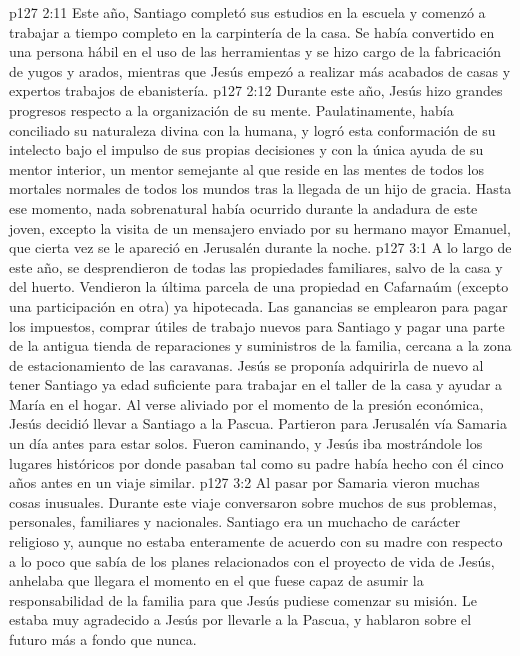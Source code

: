 \vs p127 2:11 \pc Este año, Santiago completó sus estudios en la escuela y comenzó a trabajar a tiempo completo en la carpintería de la casa. Se había convertido en una persona hábil en el uso de las herramientas y se hizo cargo de la fabricación de yugos y arados, mientras que Jesús empezó a realizar más acabados de casas y expertos trabajos de ebanistería.
\vs p127 2:12 \pc Durante este año, Jesús hizo grandes progresos respecto a la organización de su mente. Paulatinamente, había conciliado su naturaleza divina con la humana, y logró esta conformación de su intelecto bajo el impulso de sus propias decisiones y con la única ayuda de su mentor interior, un mentor semejante al que reside en las mentes de todos los mortales normales de todos los mundos tras la llegada de un hijo de gracia. Hasta ese momento, nada sobrenatural había ocurrido durante la andadura de este joven, excepto la visita de un mensajero enviado por su hermano mayor Emanuel, que cierta vez se le apareció en Jerusalén durante la noche.
\vs p127 3:1 A lo largo de este año, se desprendieron de todas las propiedades familiares, salvo de la casa y del huerto. Vendieron la última parcela de una propiedad en Cafarnaúm (excepto una participación en otra) ya hipotecada. Las ganancias se emplearon para pagar los impuestos, comprar útiles de trabajo nuevos para Santiago y pagar una parte de la antigua tienda de reparaciones y suministros de la familia, cercana a la zona de estacionamiento de las caravanas. Jesús se proponía adquirirla de nuevo al tener Santiago ya edad suficiente para trabajar en el taller de la casa y ayudar a María en el hogar. Al verse aliviado por el momento de la presión económica, Jesús decidió llevar a Santiago a la Pascua. Partieron para Jerusalén vía Samaria un día antes para estar solos. Fueron caminando, y Jesús iba mostrándole los lugares históricos por donde pasaban tal como su padre había hecho con él cinco años antes en un viaje similar.
\vs p127 3:2 Al pasar por Samaria vieron muchas cosas inusuales. Durante este viaje conversaron sobre muchos de sus problemas, personales, familiares y nacionales. Santiago era un muchacho de carácter religioso y, aunque no estaba enteramente de acuerdo con su madre con respecto a lo poco que sabía de los planes relacionados con el proyecto de vida de Jesús, anhelaba que llegara el momento en el que fuese capaz de asumir la responsabilidad de la familia para que Jesús pudiese comenzar su misión. Le estaba muy agradecido a Jesús por llevarle a la Pascua, y hablaron sobre el futuro más a fondo que nunca.
